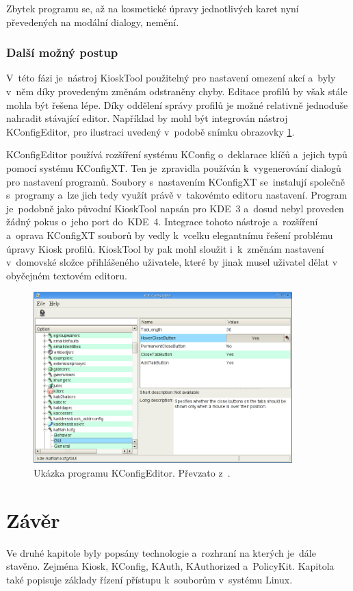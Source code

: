 Zbytek programu se, až na kosmetické úpravy jednotlivých karet nyní převedených na modální dialogy, nemění.

\subsection*{Další možný postup}
V~této fázi je~nástroj KioskTool použitelný pro nastavení omezení akcí a~byly v~něm díky provedeným změnám odstraněny chyby. Editace profilů by však stále mohla být řešena lépe. Díky oddělení správy profilů je možné relativně jednoduše nahradit stávající editor. Například by mohl být integrován nástroj KConfigEditor\cite{KConfigEditor}, pro ilustraci uvedený v~podobě snímku obrazovky \ref{fig:kconfeditor}.

KConfigEditor používá rozšíření systému KConfig o~deklarace klíčů a~jejich typů pomocí systému KConfigXT. Ten je~zpravidla používán k~vygenerování dialogů pro nastavení programů. Soubory s~nastavením KConfigXT se~instalují společně s~programy a~lze jich tedy využít právě v~takovémto editoru nastavení. Program je~podobně jako původní KioskTool napsán pro KDE~3 a~dosud nebyl proveden žádný pokus o~jeho port do~KDE~4. Integrace tohoto nástroje a~rozšíření a~oprava KConfigXT souborů by vedly k~vcelku elegantnímu řešení problému úpravy Kiosk profilů. KioskTool by pak mohl sloužit i~k~změnám nastavení v~domovské složce přihlášeného uživatele, které by jinak musel uživatel dělat v obyčejném textovém editoru.

\begin{figure}[h]
    \centering
    \includegraphics[width=10cm]{obrazky/kconfigeditor1.png}
    \caption{Ukázka programu KConfigEditor. Převzato z~\cite{KConfigEditor}.}
    \label{fig:kconfeditor}
\end{figure}


\chapter{Závěr}
Ve druhé kapitole byly popsány technologie a~rozhraní na kterých je~dále stavěno. Zejména Kiosk, KConfig, KAuth, KAuthorized a~PolicyKit. Kapitola také popisuje základy řízení přístupu k~souborům v~systému Linux.

